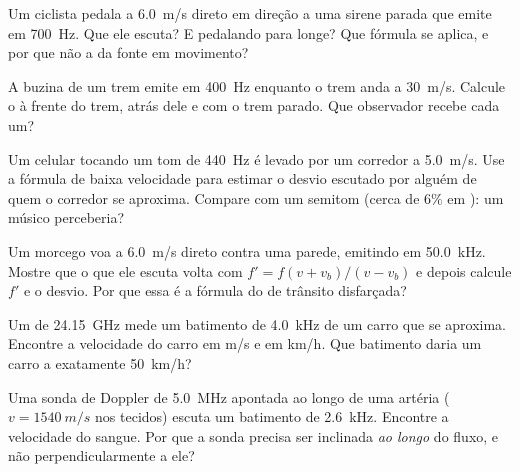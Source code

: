 \begin{exercise}[$\star$]\label{exo:g12:doppler-effect:3}
Um ciclista pedala a \qty{6.0}{m/s} direto em direção a uma sirene parada
que emite em \qty{700}{Hz}. Que  ele escuta? E pedalando para
longe? Que fórmula se aplica, e por que não a da fonte em movimento?
\end{exercise}

\begin{exercise}[$\star$]\label{exo:g12:doppler-effect:4}
A buzina de um trem emite em \qty{400}{Hz} enquanto o trem anda a
\qty{30}{m/s}. Calcule o  à frente do trem, atrás dele
e com o trem parado. Que observador recebe cada um?
\end{exercise}

\begin{exercise}[$\star$]\label{exo:g12:doppler-effect:5}
Um celular tocando um tom de \qty{440}{Hz} é levado por um corredor a
\qty{5.0}{m/s}. Use a fórmula de baixa velocidade para estimar o desvio
escutado por alguém de quem o corredor se aproxima. Compare com um
semitom (cerca de $6\%$ em ): um músico perceberia?
\end{exercise}

\begin{exercise}[$\star\star$]\label{exo:g12:doppler-effect:6}
Um morcego voa a \qty{6.0}{m/s} direto contra uma parede, emitindo em
\qty{50.0}{kHz}. Mostre que o  que ele escuta volta com
$f' = f(v + v_b)/(v - v_b)$ e depois calcule $f'$ e o desvio. Por que
essa é a fórmula do  de trânsito disfarçada?
\end{exercise}

\begin{exercise}[$\star\star$]\label{exo:g12:doppler-effect:7}
Um  de \qty{24.15}{GHz} mede um batimento de \qty{4.0}{kHz} de um
carro que se aproxima. Encontre a velocidade do carro em \unit{m/s} e em
\unit{km/h}. Que batimento daria um carro a exatamente \qty{50}{km/h}?
\end{exercise}

\begin{exercise}[$\star\star$]\label{exo:g12:doppler-effect:8}
Uma sonda de  Doppler de \qty{5.0}{MHz} apontada ao longo de uma
artéria ($v = \qty{1540}{m/s}$ nos tecidos) escuta um batimento de
\qty{2.6}{kHz}. Encontre a velocidade do sangue. Por que a sonda precisa
ser inclinada \emph{ao longo} do fluxo, e não perpendicularmente a ele?
\end{exercise}

